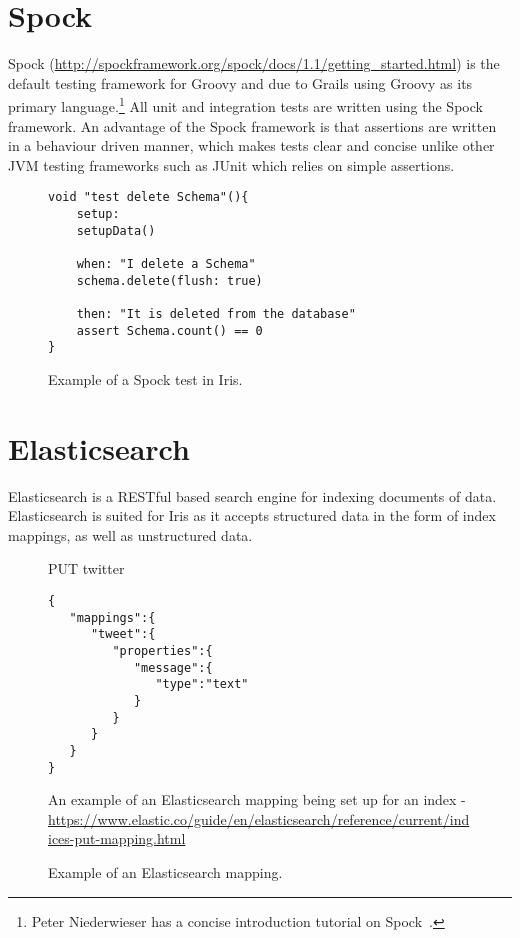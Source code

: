 \documentclass[12pt,a4paper,titlepage]{report}
\begin{document}
\section{Spock}

Spock (\url{http://spockframework.org/spock/docs/1.1/getting_started.html}) is the default testing framework for Groovy and due to Grails using Groovy as its primary language.\footnote{Peter Niederwieser has a concise introduction tutorial on Spock~\parencite{Niederwieser}.
} All unit and integration tests are written using the Spock framework. An advantage of the Spock framework is that assertions are written in a behaviour driven manner, which makes tests clear and concise unlike other JVM testing frameworks such as JUnit which relies on simple assertions.

\begin{figure}[H]
\begin{tcolorbox}
\begin{verbatim}
void "test delete Schema"(){
	setup:
	setupData()

	when: "I delete a Schema"
	schema.delete(flush: true)

	then: "It is deleted from the database"
	assert Schema.count() == 0
}
\end{verbatim}
\end{tcolorbox}
\caption{Example of a Spock test in Iris.}
\end{figure}

\section{Elasticsearch}

Elasticsearch is a RESTful based search engine for indexing documents of data. Elasticsearch is suited for Iris as it accepts structured data in the form of index mappings, as well as unstructured data. 

\begin{figure}[H]
\begin{tcolorbox}
PUT twitter
\begin{verbatim}
{
   "mappings":{
      "tweet":{
         "properties":{
            "message":{
               "type":"text"
            }
         }
      }
   }
}
\end{verbatim}
An example of an Elasticsearch mapping being set up for an index - \url{ https://www.elastic.co/guide/en/elasticsearch/reference/current/indices-put-mapping.html}
\end{tcolorbox}
\caption{Example of an Elasticsearch mapping.}
\end{figure}
\end{document}
